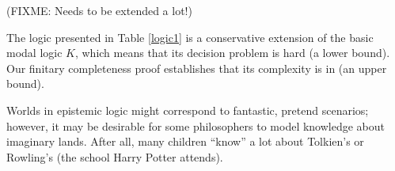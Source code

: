 (FIXME:  Needs to be extended a lot!)

The logic presented in Table \ref{logic1} is a conservative extension of the
basic modal logic $K$, which means that its decision problem is
 hard (a lower bound).  Our finitary completeness proof
establishes that its complexity is in  (an upper bound).

Worlds in epistemic logic might correspond to fantastic, pretend scenarios;
however, it may be desirable for some philosophers to model knowledge about
imaginary lands.  After all, many children ``know'' a lot about Tolkien's
{} or Rowling's {} (the school Harry Potter
attends).